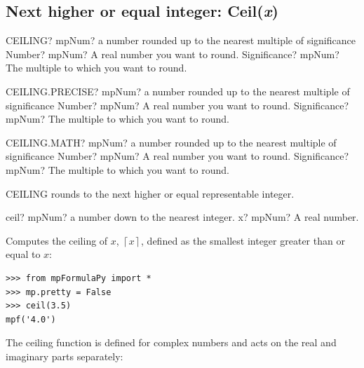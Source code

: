 \subsection{Next higher or equal integer: Ceil(\textit{x})}

\begin{mpFunctionsExtract}
	\mpWorksheetFunctionTwoNotImplemented
	{CEILING? mpNum? a number rounded up to the nearest multiple of significance}
	{Number? mpNum? A real number you want to round.}
	{Significance? mpNum? The multiple to which you want to round.}
\end{mpFunctionsExtract}


\vspace{0.6cm}
\begin{mpFunctionsExtract}
	\mpWorksheetFunctionTwoNotImplemented
	{CEILING.PRECISE? mpNum? a number rounded up to the nearest multiple of significance}
	{Number? mpNum? A real number you want to round.}
	{Significance? mpNum? The multiple to which you want to round.}
\end{mpFunctionsExtract}


\vspace{0.6cm}
\begin{mpFunctionsExtract}
	\mpWorksheetFunctionTwoNotImplemented
	{CEILING.MATH? mpNum? a number rounded up to the nearest multiple of significance}
	{Number? mpNum? A real number you want to round.}
	{Significance? mpNum? The multiple to which you want to round.}
\end{mpFunctionsExtract}

\vspace{0.3cm}
CEILING rounds to the next higher or equal representable integer.


\begin{mpFunctionsExtract}
	\mpFunctionOne
	{ceil? mpNum?  a number down to the nearest integer.}
	{x? mpNum? A real number.}
\end{mpFunctionsExtract}


\vpara
Computes the ceiling of $x$, $\left\lceil x \right\rceil $, defined as the smallest integer greater than or equal to $x$:

\begin{lstlisting}
>>> from mpFormulaPy import *
>>> mp.pretty = False
>>> ceil(3.5)
mpf('4.0')
\end{lstlisting}


The ceiling function is defined for complex numbers and acts on the real and imaginary parts separately:

